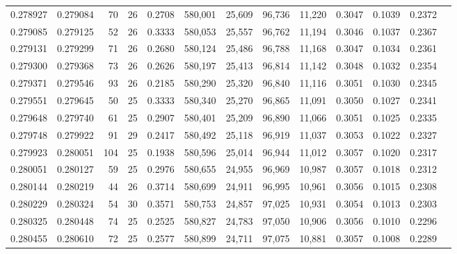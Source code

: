 \begin{tabular}{rrrrrrrrrrrrr}
0.278927 & 0.279084 &  70 &  26 &                                     0.2708 & 580,001 &  25,609 &  96,736 &  11,220 & 0.3047 & 0.1039 & 0.2372 \\
0.279085 & 0.279125 &  52 &  26 &                                     0.3333 & 580,053 &  25,557 &  96,762 &  11,194 & 0.3046 & 0.1037 & 0.2367 \\
0.279131 & 0.279299 &  71 &  26 &                                     0.2680 & 580,124 &  25,486 &  96,788 &  11,168 & 0.3047 & 0.1034 & 0.2361 \\
0.279300 & 0.279368 &  73 &  26 &                                     0.2626 & 580,197 &  25,413 &  96,814 &  11,142 & 0.3048 & 0.1032 & 0.2354 \\
0.279371 & 0.279546 &  93 &  26 &                                     0.2185 & 580,290 &  25,320 &  96,840 &  11,116 & 0.3051 & 0.1030 & 0.2345 \\
0.279551 & 0.279645 &  50 &  25 &                                     0.3333 & 580,340 &  25,270 &  96,865 &  11,091 & 0.3050 & 0.1027 & 0.2341 \\
0.279648 & 0.279740 &  61 &  25 &                                     0.2907 & 580,401 &  25,209 &  96,890 &  11,066 & 0.3051 & 0.1025 & 0.2335 \\
0.279748 & 0.279922 &  91 &  29 &                                     0.2417 & 580,492 &  25,118 &  96,919 &  11,037 & 0.3053 & 0.1022 & 0.2327 \\
0.279923 & 0.280051 & 104 &  25 &                                     0.1938 & 580,596 &  25,014 &  96,944 &  11,012 & 0.3057 & 0.1020 & 0.2317 \\
0.280051 & 0.280127 &  59 &  25 &                                     0.2976 & 580,655 &  24,955 &  96,969 &  10,987 & 0.3057 & 0.1018 & 0.2312 \\
0.280144 & 0.280219 &  44 &  26 &                                     0.3714 & 580,699 &  24,911 &  96,995 &  10,961 & 0.3056 & 0.1015 & 0.2308 \\
0.280229 & 0.280324 &  54 &  30 &                                     0.3571 & 580,753 &  24,857 &  97,025 &  10,931 & 0.3054 & 0.1013 & 0.2303 \\
0.280325 & 0.280448 &  74 &  25 &                                     0.2525 & 580,827 &  24,783 &  97,050 &  10,906 & 0.3056 & 0.1010 & 0.2296 \\
0.280455 & 0.280610 &  72 &  25 &                                     0.2577 & 580,899 &  24,711 &  97,075 &  10,881 & 0.3057 & 0.1008 & 0.2289 \\

\end{tabular}
